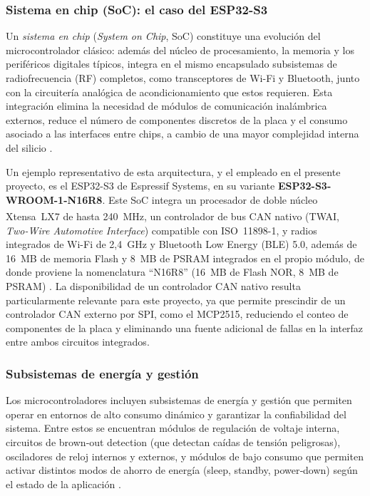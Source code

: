 \subsubsection{Sistema en chip (SoC): el caso del ESP32-S3}
Un \textit{sistema en chip} (\textit{System on Chip}, SoC) constituye una evolución del microcontrolador clásico: además del núcleo de procesamiento, la memoria y los periféricos digitales típicos, integra en el mismo encapsulado subsistemas de radiofrecuencia (RF) completos, como transceptores de Wi-Fi y Bluetooth, junto con la circuitería analógica de acondicionamiento que estos requieren. Esta integración elimina la necesidad de módulos de comunicación inalámbrica externos, reduce el número de componentes discretos de la placa y el consumo asociado a las interfaces entre chips, a cambio de una mayor complejidad interna del silicio \citep{MikroE2018}.

Un ejemplo representativo de esta arquitectura, y el empleado en el presente proyecto, es el ESP32-S3 de Espressif Systems, en su variante \textbf{ESP32-S3-WROOM-1-N16R8}. Este SoC integra un procesador de doble núcleo Xtensa\textsuperscript{\textregistered}~LX7 de hasta 240~MHz, un controlador de bus CAN nativo (TWAI, \textit{Two-Wire Automotive Interface}) compatible con ISO~11898-1, y radios integrados de Wi-Fi de 2,4~GHz y Bluetooth Low Energy (BLE) 5.0, además de 16~MB de memoria Flash y 8~MB de PSRAM integrados en el propio módulo, de donde proviene la nomenclatura ``N16R8'' (16~MB de Flash NOR, 8~MB de PSRAM) \citep{espressif_esp32_datasheet}. La disponibilidad de un controlador CAN nativo resulta particularmente relevante para este proyecto, ya que permite prescindir de un controlador CAN externo por SPI, como el MCP2515, reduciendo el conteo de componentes de la placa y eliminando una fuente adicional de fallas en la interfaz entre ambos circuitos integrados.

\subsubsection{Subsistemas de energía y gestión}
Los microcontroladores incluyen subsistemas de energía y gestión que permiten operar en entornos de alto consumo dinámico y garantizar la confiabilidad del sistema. Entre estos se encuentran módulos de regulación de voltaje interna, circuitos de brown‑out detection (que detectan caídas de tensión peligrosas), osciladores de reloj internos y externos, y módulos de bajo consumo que permiten activar distintos modos de ahorro de energía (sleep, standby, power‑down) según el estado de la aplicación \citep{MikroE2018}.

